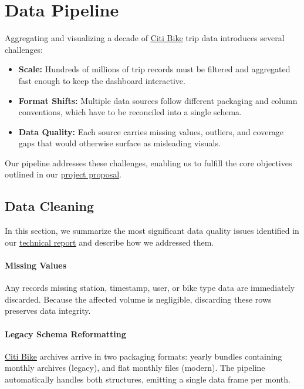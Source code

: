 \section{Data Pipeline}\label{sec:data-pipeline}
Aggregating and visualizing a decade of \href{https://www.citibikenyc.com/system-data}{\underline{Citi Bike}} trip data introduces several challenges:
\begin{itemize}
    \item \textbf{Scale:} Hundreds of millions of trip records must be filtered and aggregated fast enough to keep the dashboard interactive.
    \item \textbf{Format Shifts:} Multiple data sources follow different packaging and column conventions, which have to be reconciled into a single schema.
    \item \textbf{Data Quality:} Each source carries missing values, outliers, and coverage gaps that would otherwise surface as misleading visuals.
\end{itemize}
Our pipeline addresses these challenges, enabling us to fulfill the core objectives outlined in our \href{https://github.com/davide-dona/nyc-bike-data-visualization/blob/main/docs/proposal.pdf}{\underline{project proposal}}.

\subsection{Data Cleaning}
In this section, we summarize the most significant data quality issues identified in our \href{https://github.com/davide-dona/nyc-bike-data-visualization/blob/main/docs/technical-report.pdf}{\underline{technical report}} and describe how we addressed them.

\paragraph{Missing Values}
Any records missing station, timestamp, user, or bike type data are immediately discarded.
Because the affected volume is negligible, discarding these rows preserves data integrity.

\paragraph{Legacy Schema Reformatting}
\href{https://www.citibikenyc.com/system-data}{\underline{Citi Bike}} archives arrive in two packaging formats: yearly bundles containing monthly archives (legacy), and flat monthly files (modern).
The pipeline automatically handles both structures, emitting a single data frame per month.

